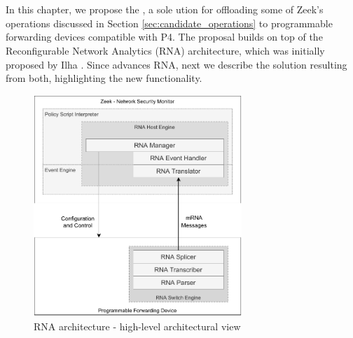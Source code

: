 \chapter{\TheSolutionName{}}
\label{cap:proposal}

In this chapter, we propose the \TheSolutionName{}, a sole
ution for offloading some of Zeek's operations discussed in Section \ref{sec:candidate_operations} to programmable forwarding devices compatible with P4. The proposal builds on top of the Reconfigurable Network Analytics (RNA) architecture, which was initially proposed by Ilha \cite{Ilha2022}. Since \TheSolutionName{} advances RNA, next we describe the solution resulting from both, highlighting the new functionality.

\begin{figure}[h]
    \caption{RNA architecture - high-level architectural view}
    \begin{center}
        \includegraphics[width=0.7\textwidth]{images/arch_high_level.pdf}  
    \end{center}
    \label{fig:arch_high_level}
\end{figure}

